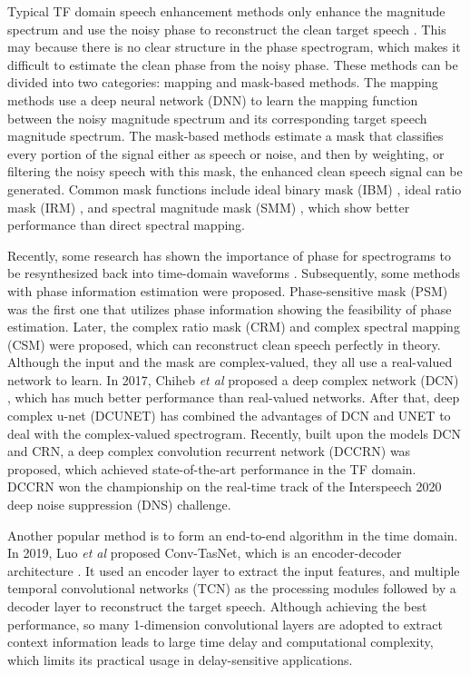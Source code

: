 \documentclass[journal,10pt]{IEEEtran}
\begin{document}
Typical TF domain speech enhancement methods only enhance the magnitude spectrum and use the noisy phase to reconstruct the clean target speech \cite{xu2014an}. This may because there is no clear structure in the phase spectrogram, which makes it difficult to estimate the clean phase from the noisy phase. These methods can be divided into two categories: mapping and mask-based methods. The mapping methods use a deep neural network (DNN) to learn the mapping function between the noisy magnitude spectrum and its corresponding target speech magnitude spectrum. The mask-based methods estimate a mask that classifies every portion of the signal either as speech or noise, and then by weighting, or filtering the noisy speech with this mask, the enhanced clean speech signal can be generated. Common mask functions include ideal binary mask (IBM) \cite{hu2001speech}, ideal ratio mask (IRM) \cite{srinivasan2006binary}, and spectral magnitude mask (SMM) \cite{wang2014on}, which show better performance than direct spectral mapping.


Recently, some research has shown the importance of phase for spectrograms to be resynthesized back into time-domain waveforms \cite{paliwal2011the}. Subsequently, some methods with phase information estimation were proposed. Phase-sensitive mask (PSM) \cite{erdogan2015phase-sensitive} was the first one that utilizes phase information showing the feasibility of phase estimation. Later,  the complex ratio mask (CRM) \cite{williamson2016complex} and complex spectral mapping (CSM) \cite{tan2019complex} were proposed, which can reconstruct clean speech perfectly in theory. Although the input and the mask are complex-valued, they all use a real-valued network to learn. In 2017, Chiheb \textit{et al} proposed a deep complex network (DCN) \cite{Chiheb2017complex}, which has much better performance than real-valued networks. After that, deep complex u-net (DCUNET) \cite{choi2018phase} has combined the advantages of DCN and UNET \cite{ronneberger2015u} to deal with the complex-valued spectrogram. Recently, built upon the models DCN and CRN, a deep complex convolution recurrent network (DCCRN) \cite{hu2020dccrn} was proposed, which achieved state-of-the-art performance in the TF domain. DCCRN won the championship on the real-time track of the Interspeech 2020 deep noise suppression (DNS) challenge.

Another popular method is to form an end-to-end algorithm in the time domain. In 2019, Luo \textit{et al} proposed Conv-TasNet, which is an encoder-decoder architecture \cite{luo2019conv}. It used an encoder layer to extract the input features, and multiple temporal convolutional networks (TCN) as the processing modules followed by a decoder layer to reconstruct the target speech. Although achieving the best performance, so many 1-dimension convolutional layers are adopted to extract context information leads to large time delay and computational complexity, which limits its practical usage in delay-sensitive applications.
\end{document}
